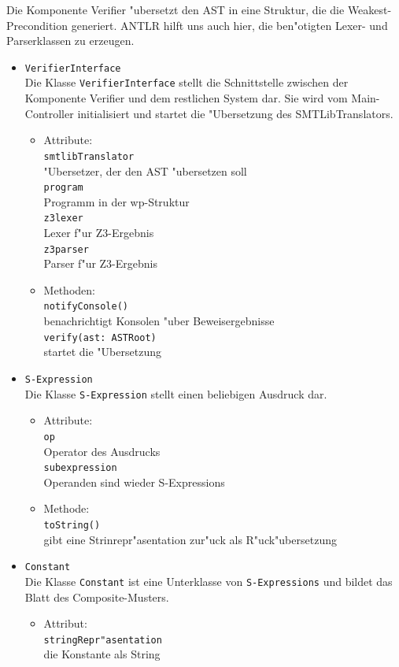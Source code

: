 \documentclass[10pt,a4paper,titlepage]{article}
\begin{document}
Die Komponente Verifier "ubersetzt den AST in eine Struktur, die die Weakest-Precondition generiert. ANTLR hilft uns auch hier, die ben"otigten Lexer- und Parserklassen zu erzeugen. 
\begin{itemize}
\item \texttt{VerifierInterface} \\
Die Klasse \texttt{VerifierInterface} stellt die Schnittstelle zwischen der Komponente Verifier und dem restlichen System dar. Sie wird vom Main-Controller initialisiert und startet die "Ubersetzung des SMTLibTranslators. 
\begin{itemize}
\item Attribute: \\
\texttt{smtlibTranslator} \\
"Ubersetzer, der den AST "ubersetzen soll \\
\texttt{program} \\
Programm in der wp-Struktur \\
\texttt{z3lexer} \\
Lexer f"ur Z3-Ergebnis \\
\texttt{z3parser} \\
Parser f"ur Z3-Ergebnis \\
\item Methoden: \\
\texttt{notifyConsole()} \\
benachrichtigt Konsolen "uber Beweisergebnisse \\
\texttt{verify(ast: ASTRoot)} \\
startet die "Ubersetzung
\end{itemize}
\item \texttt{S-Expression} \\
Die Klasse \texttt{S-Expression} stellt einen beliebigen Ausdruck dar. 
\begin{itemize}
\item Attribute: \\
\texttt{op} \\
Operator des Ausdrucks \\
\texttt{subexpression} \\
Operanden sind wieder S-Expressions 
\item Methode: \\
\texttt{toString()} \\
gibt eine Strinrepr"asentation zur"uck als R"uck"ubersetzung 
\end{itemize}
\item \texttt{Constant} \\
Die Klasse \texttt{Constant} ist eine Unterklasse von \texttt{S-Expressions} und bildet das Blatt des Composite-Musters. 
\begin{itemize}
\item Attribut: \\
\texttt{stringRepr"asentation} \\
die Konstante als String \\
\end{itemize}
\end{itemize}
\end{document}
